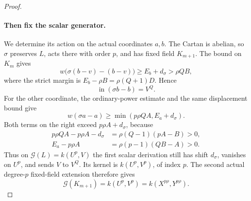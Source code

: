 \begin{proof}
\paragraph{Then fix the scalar generator.}
We determine its action on the actual coordinates $a,b$. The Cartan is abelian, so $\sigma$ preserves $L$, acts there with order $p$, and has fixed field $K_{m+1}$. The bound on $K_m$ gives
\[
 w\bigl(\sigma(b-v)-(b-v)\bigr)\ge E_b+d_\sigma>\rho QB,
\]
where the strict margin is $E_b-\rho B=\rho(Q+1)D$. Hence
\begin{equation}\label{eq:full-cartan-scalar-b}
 \operatorname{in}(\sigma b-b)=V^Q.
\end{equation}
For the other coordinate, the ordinary-power estimate and the same displacement bound give
\begin{equation}\label{eq:full-cartan-scalar-a}
 w(\sigma a-a)\ge\min(p\rho QA,E_a+d_\sigma).
\end{equation}
Both terms on the right exceed $p\rho A+d_\sigma$, because
\[
 \begin{split}
 p\rho QA-p\rho A-d_\sigma&=\rho(Q-1)(pA-B)>0,\\
 E_a-p\rho A&=\rho(p-1)(QB-A)>0.
 \end{split}
\]
Thus on $\mathcal G(L)=k(U^p,V)$ the first scalar derivation still has shift $d_\sigma$, vanishes on $U^p$, and sends $V$ to $V^Q$. Its kernel is $k(U^p,V^p)$, of index $p$. The second actual degree-$p$ fixed-field extension therefore gives
\begin{equation}\label{eq:full-cartan-next-field}
 \mathcal G(K_{m+1})=k(U^p,V^p)=k(X^{p\rho},Y^{p\rho}).
\end{equation}


\end{proof}
